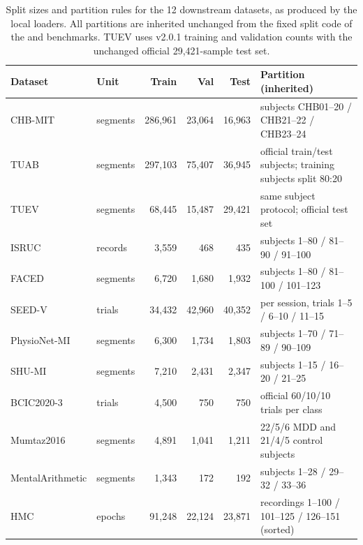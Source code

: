\begin{table}[t]
\centering
\caption{Split sizes and partition rules for the 12 downstream datasets, as
produced by the local loaders. All partitions are inherited unchanged from the
fixed split code of the \cbramod{} and \reve{} benchmarks. TUEV uses v2.0.1
training and validation counts with the unchanged official 29,421-sample test
set.}
\label{tab:splits}
\scriptsize
\setlength{\tabcolsep}{4pt}
\renewcommand{\arraystretch}{1.06}
\begin{tabularx}{\textwidth}{@{}l l r r r X@{}}
\toprule
Dataset & Unit & Train & Val & Test & Partition (inherited) \\
\midrule
CHB-MIT & segments & 286{,}961 & 23{,}064 & 16{,}963 & subjects CHB01--20 / CHB21--22 / CHB23--24 \\
TUAB & segments & 297{,}103 & 75{,}407 & 36{,}945 & official train/test subjects; training subjects split 80:20 \\
TUEV & segments & 68{,}445 & 15{,}487 & 29{,}421 & same subject protocol; official test set \\
ISRUC & records & 3{,}559 & 468 & 435 & subjects 1--80 / 81--90 / 91--100 \\
FACED & segments & 6{,}720 & 1{,}680 & 1{,}932 & subjects 1--80 / 81--100 / 101--123 \\
SEED-V & trials & 34{,}432 & 42{,}960 & 40{,}352 & per session, trials 1--5 / 6--10 / 11--15 \\
PhysioNet-MI & segments & 6{,}300 & 1{,}734 & 1{,}803 & subjects 1--70 / 71--89 / 90--109 \\
SHU-MI & segments & 7{,}210 & 2{,}431 & 2{,}347 & subjects 1--15 / 16--20 / 21--25 \\
BCIC2020-3 & trials & 4{,}500 & 750 & 750 & official 60/10/10 trials per class \\
Mumtaz2016 & segments & 4{,}891 & 1{,}041 & 1{,}211 & 22/5/6 MDD and 21/4/5 control subjects \\
MentalArithmetic & segments & 1{,}343 & 172 & 192 & subjects 1--28 / 29--32 / 33--36 \\
HMC & epochs & 91{,}248 & 22{,}124 & 23{,}871 & recordings 1--100 / 101--125 / 126--151 (sorted) \\
\bottomrule
\end{tabularx}
\end{table}
\FloatBarrier

